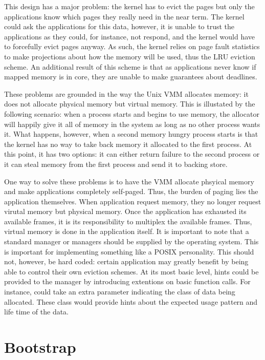 This design has a major problem: the kernel has to evict the pages but
only the applications know which pages they really need in the near
term.  The kernel could ask the applications for this data, however,
it is unable to trust the applications as they could, for instance,
not respond, and the kernel would have to forcefully evict pages
anyway.  As such, the kernel relies on page fault statistics to make
projections about how the memory will be used, thus the LRU eviction
scheme.  An additional result of this scheme is that as applications
never know if mapped memory is in core, they are unable to make
guarantees about deadlines.

These problems are grounded in the way the Unix VMM allocates memory:
it does not allocate physical memory but virtual memory.  This is
illustated by the following scenario: when a process starts and begins
to use memory, the allocator will happily give it all of memory in the
system as long as no other process wants it.  What happens, however,
when a second memory hungry process starts is that the kernel has no
way to take back memory it allocated to the first process.  At this
point, it has two options: it can either return failure to the second
process or it can steal memory from the first process and send it to
backing store.

One way to solve these problems is to have the VMM allocate phsyical
memory and make applications completely self-paged.  Thus, the burden
of paging lies the application themselves.  When application request
memory, they no longer request virutal memory but physical memory.
Once the application has exhausted its available frames, it is its
responsibility to multiplex the available frames.  Thus, virtual
memory is done in the application itself.  It is important to note
that a standard manager or managers should be supplied by the
operating system.  This is important for implementing something like a
POSIX personality.  This should not, however, be hard coded: certain
application may greatly benefit by being able to control their own
eviction schemes.  At its most basic level, hints could be provided to
the manager by introducing extentions on basic function calls.  For
instance,  could take an extra parameter indicating
the class of data being allocated.  These class would provide hints
about the expected usage pattern and life time of the data.

\section{Bootstrap}

